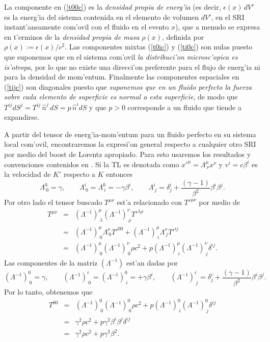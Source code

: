 La componente en (\ref{t00c}) es la \textit{densidad propia de energ'ia} (es decir, $\epsilon(x)\,dV'$ es la energ'ia del sistema contenida en el elemento de volumen $dV'$, en el SRI instant'aneamente com'ovil con el fluido en el evento $x$), que a menudo se expresa en t'erminos de la \textit{densidad propia de masa} $\rho(x)$, definida por $\rho(x):=\epsilon(x)/c^2$. Las componentes
mixtas (\ref{t0ic}) y (\ref{ti0c}) son nulas puesto que suponemos que en el sistema com'ovil \textit{la distribuci'on microsc'opica es is'otropa}, por lo que no existe una direcci'on preferente para el flujo de energ'ia ni para la densidad de mom'entum. Finalmente las componentes espaciales
en (\ref{tijc}) son diagonales puesto que \textit{suponemos que en un fluido
perfecto la fuerza sobre cada elemento de superficie es normal a esta
superficie}, de modo que $T^{ij}dS^j=T^{ij}\,\hat{n}^j\,dS=p\,\hat{n}^i dS$ y que $p>0$ corresponde a un fluido que tiende a expandirse.

A partir del tensor de energ'ia-mom'entum para un fluido perfecto en su sistema local com'ovil, encontraremos la expresi'on general respecto a cualquier
otro SRI por medio del boost de Lorentz apropiado. Para esto usaremos los resultados y convenciones contenidos en \cite{7}. Si la TL es denotada como $x'^\mu=\Lambda^\mu_{\ \nu}x^\nu$ y $v^i=c\beta^i$ es la velocidad de $K'$ respecto a $K$ entonces
\begin{equation}
 \Lambda^0_{\ 0}=\gamma, \qquad \Lambda^i_{\ 0}=\Lambda^0_{\ i}=-\gamma\beta^i, \qquad \Lambda^i_{\ j}=\delta^i_j
+\frac{(\gamma-1) }{\beta^2}\beta^i\beta^j .
\end{equation}
Por otro lado el tensor buscado $T^{\mu\nu}$ est'a relacionado con $T'^{\mu\nu}$ por medio de
\begin{eqnarray}
T^{\mu\nu}&=&(\Lambda^{-1})^\mu_{\ \lambda}(\Lambda^{-1})^\nu_{\ \rho}T'^{\lambda\rho}
\\
&=& (\Lambda^{-1})^\mu_{\ 0}\Lambda^\nu_{\ 0}T'^{00}+(\Lambda^{-1})^\mu_{\
i}\Lambda^\nu_{\ j}T'^{ij}\\
&=& (\Lambda^{-1})^\mu_{\ 0}(\Lambda^{-1})^\nu_{\ 0}\rho c^2+p(\Lambda^{-1})^\mu_{\
i}(\Lambda^{-1})^\nu_{\ j}\delta^{ij}.
\end{eqnarray}
Las componentes de la matriz $(\Lambda^{-1})$ est'an dadas por
\begin{equation}
(\Lambda^{-1})^0_{\ 0}=\gamma, \qquad (\Lambda^{-1})^i_{\ 0}=(\Lambda^{-1})^0_{\ i}=+\gamma\beta^i, \qquad (\Lambda^{-1})^i_{\ j}=\delta^i_j
+\frac{(\gamma-1) }{\beta^2}\beta^i\beta^j .
\end{equation}
Por lo tanto, obtenemos que
\begin{eqnarray}
T^{00}&=& (\Lambda^{-1})^0_{\ 0}(\Lambda^{-1})^0_{\ 0}\rho c^2+p(\Lambda^{-1})^0_{\ i}(\Lambda^{-1})^0_{\ j}\delta^{ij} \\
&=& \gamma^2\rho c^2+p\gamma^2\beta^i\beta^j\delta^{ij} \\
&=& \gamma^2\rho c^2+p\gamma^2\beta^2 .
\end{eqnarray}

